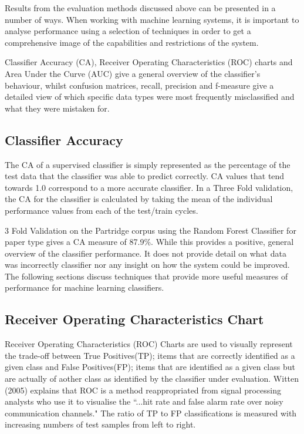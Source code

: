 Results from the evaluation methods discussed above can be presented in a
number of ways. When working with machine learning systems, it is important to
analyse performance using a selection of techniques in order to get a
comprehensive image of the capabilities and restrictions of the system.

Classifier Accuracy (CA), Receiver Operating Characteristics
(ROC) charts and Area Under the Curve (AUC) give a general overview of the
classifier's behaviour, whilst confusion matrices, recall, precision and
f-measure give a detailed view of which specific data types were most
frequently misclassified and what they were mistaken for. 

\subsection{ Classifier Accuracy } 

The CA of a supervised classifier is simply represented as the percentage of
the test data that the classifier was able to predict correctly. CA values that
tend towards 1.0 correspond to a more accurate classifier. In a Three Fold
validation, the CA for the classifier is calculated by taking the mean of the
individual performance values from each of the test/train cycles. 

3 Fold Validation on the Partridge corpus using the Random Forest Classifier
for paper type gives a CA measure of 87.9\%. While this provides a positive,
general overview of the classifier performance. It does not provide detail on
what data was incorrectly classifier nor any insight on how the system could be
improved. The following sections discuss techniques that provide more useful
measures of performance for machine learning classifiers.

\subsection{ Receiver Operating Characteristics Chart}

Receiver Operating Characteristics (ROC) Charts are used to visually represent
the trade-off between True Positives(TP); items that are correctly identified
as a given class and False Positives(FP); items that are identified as a given
class but are actually of aother class as identified
by the classifier under evaluation. Witten (2005) explains that ROC is a method
reappropriated from signal processing analysts who use it to visualise the ``...hit
rate and false alarm rate over noisy communication
channels\cite{witten2005data}." The ratio of TP to FP classifications is
measured with increasing numbers of test samples from left to right. 

